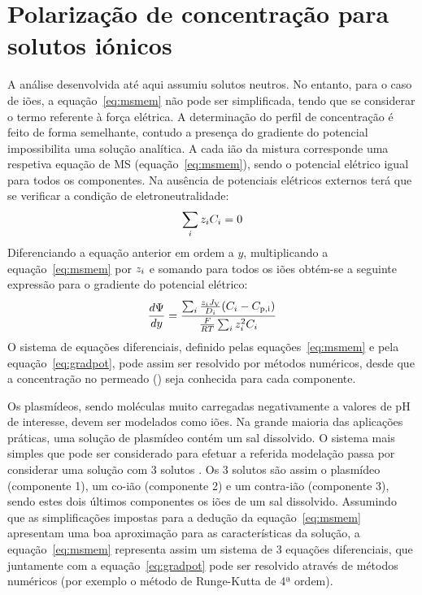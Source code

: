 \section{Polarização de concentração para solutos iónicos} %
\label{sec:ioes}
A análise desenvolvida até aqui assumiu solutos neutros. No entanto, para o caso de iões, a equação~\ref{eq:msmem} não pode ser simplificada, tendo que se considerar o termo referente à força elétrica. A determinação do perfil de concentração é feito de forma semelhante, contudo a presença do gradiente do potencial impossibilita uma solução analítica. A cada ião da mistura corresponde uma respetiva equação de MS (equação~\ref{eq:msmem}), sendo o potencial elétrico igual para todos os componentes. Na ausência de potenciais elétricos externos terá que se verificar a condição de eletroneutralidade:
\begin{equation}
	\label{eq:eleneutra}
	\sum_{i} z_i C_i=0
\end{equation}
Diferenciando a equação anterior em ordem a $y$, multiplicando a equação~\ref{eq:msmem} por $z_i$ e somando para todos os iões obtém-se a seguinte expressão para o gradiente do potencial elétrico:
\begin{equation}
	\label{eq:gradpot}
	\frac{d\Psi}{dy}=\frac{\sum_{i} \frac{z_{i}J_{\mathrm{V}}}{D_i}(C_i-C_{\mathrm{p,i}})}{\frac{F}{R T}\sum_{i}z_{i}^{2}C_i}
\end{equation}
O sistema de equações diferenciais, definido pelas equações~\ref{eq:msmem} e pela equação~\ref{eq:gradpot}, pode assim ser resolvido por métodos numéricos, desde que a concentração no permeado (\concp) seja conhecida para cada componente. 

Os plasmídeos, sendo moléculas muito carregadas negativamente a valores de pH de interesse, devem ser modelados como iões. 
Na grande maioria das aplicações práticas, uma solução de plasmídeo contém um sal dissolvido. O sistema mais simples que pode ser considerado para efetuar a referida modelação passa por considerar uma solução  com 3 solutos \cite{wesslargepoli}. Os 3 solutos são assim o plasmídeo (componente 1), um co-ião (componente 2) e um contra-ião (componente 3), sendo estes dois últimos componentes os iões de um sal dissolvido. Assumindo que as simplificações impostas para a dedução da equação~\ref{eq:msmem} apresentam uma boa aproximação para as características da solução, a equação~\ref{eq:msmem} representa assim um sistema de 3 equações diferenciais, que juntamente com a equação~\ref{eq:gradpot} pode ser resolvido através de métodos numéricos (por exemplo o método de Runge-Kutta de 4ª ordem). 

